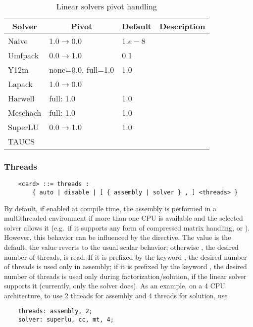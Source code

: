 \begin{table}
\centering
\caption{Linear solvers pivot handling}\label{tab:solvers-pivot}
\begin{tabular}{llll}
\hline\hline
	\multicolumn{1}{c}{\textbf{Solver}} &
	\multicolumn{1}{c}{\textbf{Pivot}} &
	\multicolumn{1}{c}{\textbf{Default}} &
	\multicolumn{1}{c}{\textbf{Description}} \\
\hline
	Naive		& 1.0$\rightarrow$0.0	& 1.$e-8$	& \\
	Umfpack 	& 0.0$\rightarrow$1.0 	& 0.1 		& \\
	Y12m 		& none=0.0, full=1.0	& 1.0		& \\
	Lapack		& 1.0$\rightarrow$0.0	&		& \\
	Harwell		& full: 1.0		& 1.0		& \\
	Meschach	& full: 1.0		& 1.0		& \\
	SuperLU		& 0.0$\rightarrow$1.0	& 1.0		& \\
	TAUCS		&			&		& \\
\hline\hline
\end{tabular}
\end{table}


\subsubsection{Threads}   
\begin{verbatim}
    <card> ::= threads :
        { auto | disable | [ { assembly | solver } , ] <threads> }
\end{verbatim}
By default, if enabled at compile time, the assembly is performed
in a multithreaded environment if more than one CPU is available 
and the selected solver allows it (e.g.\ if it supports any form 
of compressed matrix handling,  or ).
However, this behavior can be influenced by the  directive.
The value  is the default; the value  reverts
to the usual scalar behavior; otherwise , the desired 
number of threads, is read.
If it is prefixed by the keyword , the desired number
of threads is used only in assembly; if it is prefixed by the keyword
, the desired number of threads is used only during 
factorization/solution, if the linear solver supports it (currently,
only the  solver does).
As an example, on a 4 CPU architecture, to use 2 threads for assembly
and 4 threads for solution, use
\begin{verbatim}
    threads: assembly, 2;
    solver: superlu, cc, mt, 4;
\end{verbatim}





